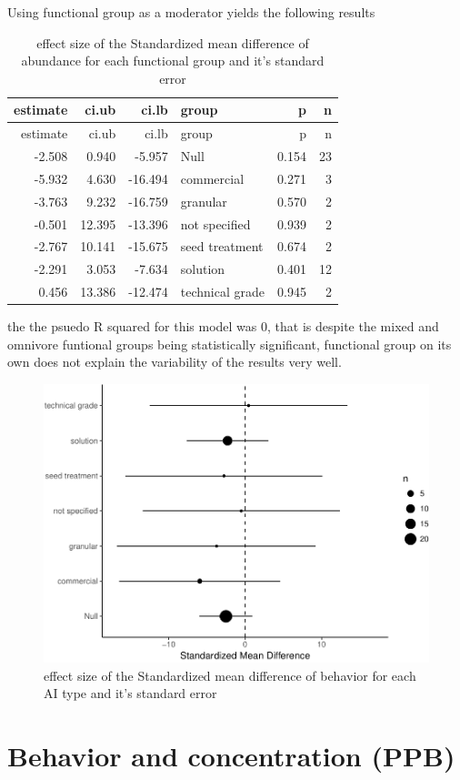 \documentclass[]{elsarticle} %
\makeatletter
\def\maxwidth{\ifdim\Gin@nat@width>\linewidth\linewidth
\else\Gin@nat@width\fi}
\let\Oldincludegraphics\includegraphics
\renewcommand{\includegraphics}[1]{\Oldincludegraphics[width=\maxwidth]{#1}}
\makeatother
\begin{document}
Using functional group as a moderator yields the following results

\begin{longtable}[c]{@{}rrrlrr@{}}
\caption{effect size of the Standardized mean difference of abundance
for each functional group and it's standard error}\tabularnewline
\toprule
estimate & ci.ub & ci.lb & group & p & n\tabularnewline
\midrule
\endfirsthead
\toprule
estimate & ci.ub & ci.lb & group & p & n\tabularnewline
\midrule
\endhead
-2.508 & 0.940 & -5.957 & Null & 0.154 & 23\tabularnewline
-5.932 & 4.630 & -16.494 & commercial & 0.271 & 3\tabularnewline
-3.763 & 9.232 & -16.759 & granular & 0.570 & 2\tabularnewline
-0.501 & 12.395 & -13.396 & not specified & 0.939 & 2\tabularnewline
-2.767 & 10.141 & -15.675 & seed treatment & 0.674 & 2\tabularnewline
-2.291 & 3.053 & -7.634 & solution & 0.401 & 12\tabularnewline
0.456 & 13.386 & -12.474 & technical grade & 0.945 & 2\tabularnewline
\bottomrule
\end{longtable}

the the psuedo R squared for this model was 0, that is despite the mixed
and omnivore funtional groups being statistically significant,
functional group on its own does not explain the variability of the
results very well.

\begin{figure}[htbp]
\centering
\includegraphics{MetanalysisNeonics_files/figure-latex/unnamed-chunk-20-1.pdf}
\caption{effect size of the Standardized mean difference of behavior for
each AI type and it's standard error}
\end{figure}

\section{Behavior and concentration
(PPB)}\label{behavior-and-concentration-ppb}
\end{document}
